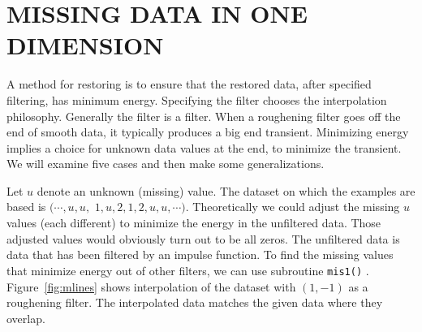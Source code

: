 \section{MISSING DATA IN ONE DIMENSION}
\par
A method for restoring  is to ensure that the restored data,
after specified filtering, has minimum energy.
Specifying the filter chooses the interpolation philosophy.
Generally the filter is a  filter.
When a roughening filter goes off the end of smooth data,
it typically produces a big end transient.
Minimizing energy implies a choice for unknown data values
at the end, to minimize the transient.
We will examine five cases and then make some generalizations.
\par
{}
\par
Let $u$ denote an unknown (missing) value.
The dataset on which the examples are based is
$(\cdots, u, u,$ 
$1, u, 2, 1, 2, u, u, \cdots )$.
Theoretically we could adjust the missing $u$ values (each different)
to minimize the energy in the unfiltered data.
Those adjusted values would obviously turn out to be all zeros.
The unfiltered data is data that has been filtered by
an impulse function.
To find the missing values
that minimize energy out of other filters,
we can use subroutine \texttt{mis1()} .
Figure~\ref{fig:mlines}
shows interpolation of the dataset with $(1,-1)$ as a roughening filter.
The interpolated data matches the given data where they overlap.%
